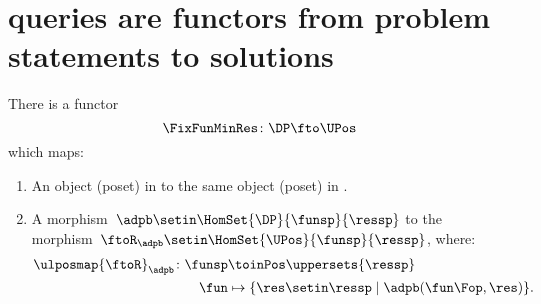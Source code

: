 \section{\DP queries are functors from problem statements to solutions}

\begin{lemma}
    \label{lem:covfunctor}
    There is a functor
    \begin{equation}
        \FixFunMinRes\colon \DP \fto \UPos
    \end{equation}
    which maps:
    \begin{enumerate}
        \item An object (poset) in \DP to the same object (poset) in \UPos.
        \item A morphism~$\adpb\setin \HomSet{\DP}{\funsp}{\ressp}$ to the morphism~$\ftoR_{\adpb}\setin \HomSet{\UPos}{\funsp}{\ressp}$, where:
              \begin{equation}
                  \begin{aligned}
                      \ulposmap{\ftoR}_{\adpb}\colon \funsp & \toinPos \uppersets{\ressp} \\
                      \fun                                  & \mapsto \{\res \setin \ressp\mid \adpb(\fun\Fop,\res)\}.
                  \end{aligned}
              \end{equation}
    \end{enumerate}
\end{lemma}

